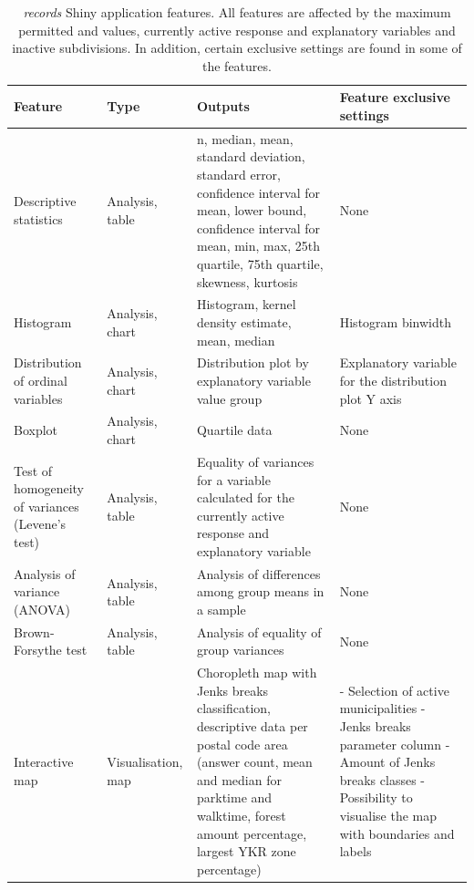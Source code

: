 \begin{table}[H]
    \centering
    \caption[Records Shiny application features]{\textit{records} Shiny application features. All features are affected by the maximum permitted  and  values, currently active response and explanatory variables and inactive subdivisions. In addition, certain exclusive settings are found in some of the features.}
    \label{tab:records_shiny_features}
    \scalebox{0.8}
    {\def\arraystretch{1.3}
    \setlength\tabcolsep{1.2ex}
    \begin{tabular}{ @{} >{\raggedright\arraybackslash}p{3cm} >{\raggedright\arraybackslash}p{2cm} >{\raggedright\arraybackslash}p{6cm} >{\raggedright\arraybackslash}p{6cm} @{} }
        \toprule
        Feature & Type & Outputs & Feature exclusive settings \\
        \midrule
        1 Descriptive statistics & Analysis, table & n, median, mean, standard deviation, standard error, confidence interval for mean, lower bound, confidence interval for mean, min, max, 25th quartile, 75th quartile, skewness, kurtosis & None \\
        2 Histogram & Analysis, chart & Histogram, kernel density estimate, mean, median & Histogram binwidth \\
        3 Distribution of ordinal variables & Analysis, chart & Distribution plot by explanatory variable value group & Explanatory variable for the distribution plot Y axis \\
        4 Boxplot & Analysis, chart & Quartile data & None \\
        5 Test of homogeneity of variances (Levene's test) & Analysis, table & Equality of variances for a variable calculated for the currently active response and explanatory variable & None \\
        6 Analysis of variance (ANOVA) & Analysis, table & Analysis of differences among group means in a sample & None \\
        7 Brown-Forsythe test & Analysis, table & Analysis of equality of group variances & None \\
        8 Interactive map & Visualisation, map & Choropleth map with Jenks breaks classification, descriptive data per postal code area (answer count, mean and median for parktime and walktime, forest amount percentage, largest YKR zone percentage) & - Selection of active municipalities \linebreak - Jenks breaks parameter column \linebreak - Amount of Jenks breaks classes \linebreak - Possibility to visualise the map with boundaries and labels \\
        \bottomrule
    \end{tabular}}
\end{table} 

